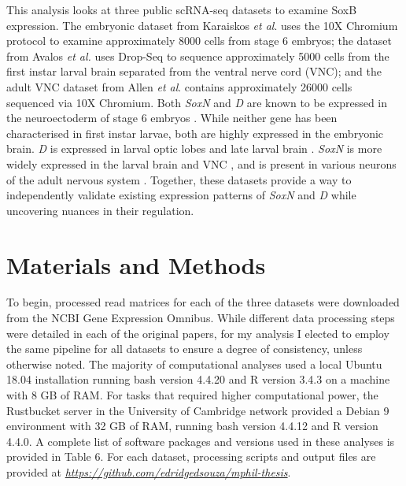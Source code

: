 \documentclass[withindex,glossary]{cam-thesis}
\begin{document}
This analysis looks at three public scRNA-seq datasets to examine SoxB
expression. The embryonic dataset from Karaiskos \emph{et al}. uses the
10X Chromium protocol to examine approximately 8000 cells from stage 6
embryos; the dataset from Avalos \emph{et al.} uses Drop-Seq to sequence
approximately 5000 cells from the first instar larval brain separated
from the ventral nerve cord (\gls{VNC}); and the adult VNC dataset from Allen
\emph{et al}. contains approximately 26000 cells sequenced via 10X
Chromium. Both \emph{SoxN} and \emph{D} are known to be expressed in the
neuroectoderm of stage 6 embryos . While neither gene has been characterised
in first instar larvae, both are highly expressed in the embryonic
brain. \emph{D} is expressed in larval optic lobes  and late larval brain . \emph{SoxN} is more
widely expressed in the larval brain and VNC , and
is present in various neurons of the adult nervous system . Together, these datasets provide a way to independently
validate existing expression patterns of \emph{SoxN} and \emph{D} while
uncovering nuances in their regulation.

\section{Materials and Methods}

To begin, processed read matrices for each of the three datasets were
downloaded from the NCBI Gene Expression Omnibus. While different data
processing steps were detailed in each of the original papers, for my
analysis I elected to employ the same pipeline for all datasets to
ensure a degree of consistency, unless otherwise noted. The majority of
computational analyses used a local Ubuntu 18.04 installation running
bash version 4.4.20 and R version 3.4.3 on a machine with 8 GB of RAM.
For tasks that required higher computational power, the Rustbucket
server in the University of Cambridge network provided a Debian 9
environment with 32 GB of RAM, running bash version 4.4.12 and R version
4.4.0. A complete list of software packages and versions used in these
analyses is provided in Table 6. For each dataset, processing scripts
and output files are provided at \href{https://github.com/edridgedsouza/mphil-thesis}{\emph{https://github.com/edridgedsouza/mphil-thesis}}.
\end{document}

